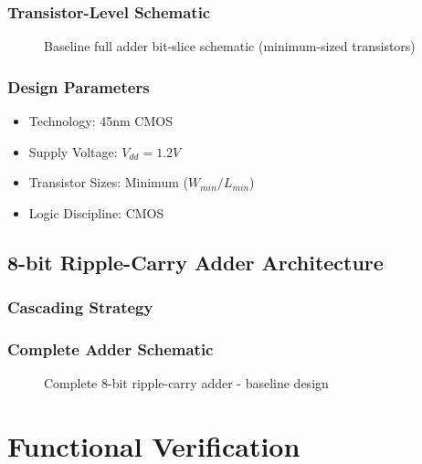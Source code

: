 \documentclass[12pt,letterpaper]{article}
\begin{document}
\subsubsection{Transistor-Level Schematic}

\begin{figure}[H]
    \centering
    \caption{Baseline full adder bit-slice schematic (minimum-sized transistors)}
    \label{fig:baseline_bitslice}
\end{figure}

\subsubsection{Design Parameters}

\begin{itemize}
    \item Technology: 45nm CMOS
    \item Supply Voltage: $V_{dd} = 1.2V$
    \item Transistor Sizes: Minimum ($W_{min}/L_{min}$)
    \item Logic Discipline: CMOS
\end{itemize}

\subsection{8-bit Ripple-Carry Adder Architecture}

\subsubsection{Cascading Strategy}

\subsubsection{Complete Adder Schematic}

\begin{figure}[H]
    \centering
    \caption{Complete 8-bit ripple-carry adder - baseline design}
    \label{fig:baseline_8bit}
\end{figure}

\section{Functional Verification}
\label{sec:verification}
\end{document}
